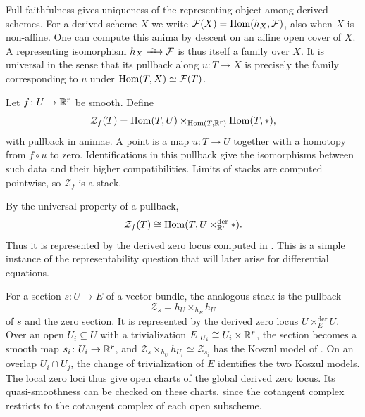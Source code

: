
Full faithfulness gives uniqueness of the representing object among
derived schemes. For a derived scheme $X$ we
write $\mathcal F(X)=\operatorname{Hom}(h_X,\mathcal F)$, also when $X$ is
non-affine. One can compute this anima by descent on an affine open
cover of $X$. A representing isomorphism $h_X\iso\mathcal F$ is thus
itself a family over $X$. It is universal in the sense that its
pullback along $u\colon T\to X$ is precisely the family corresponding
to $u$ under $\operatorname{Hom}(T,X)\simeq\mathcal F(T)$.

Let $f\colon U\to\mathbb{R}^r$ be smooth. Define
\begin{equation}\label{eq:Derived_Zero_Locus_Prestack}
 \mathcal Z_f(T)=\operatorname{Hom}(T,U)\times_{\operatorname{Hom}(T,\mathbb{R}^r)}\operatorname{Hom}(T,*),
\end{equation}
with pullback in animae.
A point is a map $u\colon T\to U$ together with a homotopy from $f\circ u$
to zero. Identifications in this pullback give the isomorphisms between
such data and their higher compatibilities. Limits of stacks are computed pointwise, so
$\mathcal Z_f$ is a stack.

By the universal property of a pullback,
\[
 \mathcal Z_f(T)\cong\operatorname{Hom}(T,U\times_{\mathbb{R}^r}^{\mathrm{der}}*).
\]
Thus it is represented by the derived zero locus computed in .
This is a simple instance of the representability question that will
later arise for differential equations.

For a section $s\colon U\to E$ of a vector bundle, the analogous stack is
the pullback
\[
 \mathcal Z_s=h_U\times_{h_E}h_U
\]
of $s$ and the zero section. It is represented by the derived zero locus
$U\times_E^{\mathrm{der}}U$. Over an open $U_i\subseteq U$ with a
trivialization $E|_{U_i}\cong U_i\times\mathbb{R}^r$, the section becomes a smooth
map $s_i\colon U_i\to\mathbb{R}^r$, and
$\mathcal Z_s\times_{h_U}h_{U_i}\simeq\mathcal Z_{s_i}$ has the Koszul
model of .
On an overlap $U_i\cap U_j$, the change of trivialization of $E$
identifies the two Koszul models. The local zero loci thus give open
charts of the global derived zero locus. Its quasi-smoothness can be
checked on these charts, since the cotangent complex restricts to the
cotangent complex of each open subscheme.

